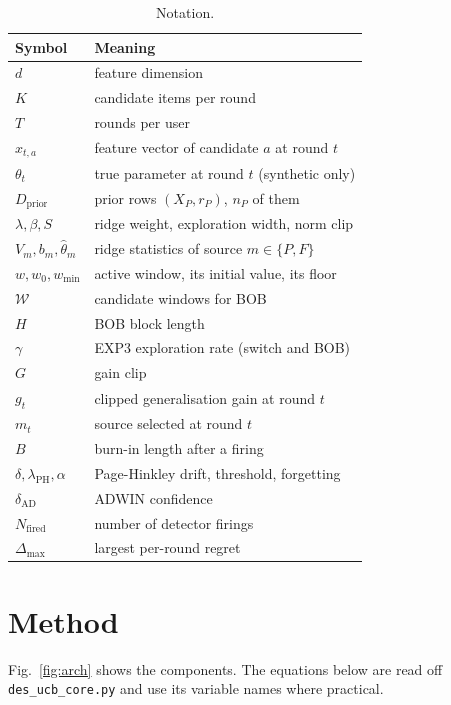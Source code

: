 \begin{table}[t]
\centering
\caption{Notation.}
\label{tab:notation}
\small
\begin{tabular}{ll}
\toprule
Symbol & Meaning \\
\midrule
$d$ & feature dimension \\
$K$ & candidate items per round \\
$T$ & rounds per user \\
$x_{t,a}$ & feature vector of candidate $a$ at round $t$ \\
$\theta_t$ & true parameter at round $t$ (synthetic only) \\
$D_{\mathrm{prior}}$ & prior rows $(X_P,r_P)$, $n_P$ of them \\
$\lambda,\beta,S$ & ridge weight, exploration width, norm clip \\
$V_m,b_m,\hat\theta_m$ & ridge statistics of source $m\in\{P,F\}$ \\
$w,w_0,w_{\min}$ & active window, its initial value, its floor \\
$\mathcal W$ & candidate windows for BOB \\
$H$ & BOB block length \\
$\gamma$ & EXP3 exploration rate (switch and BOB) \\
$G$ & gain clip \\
$g_t$ & clipped generalisation gain at round $t$ \\
$m_t$ & source selected at round $t$ \\
$B$ & burn-in length after a firing \\
$\delta,\lambda_{\mathrm{PH}},\alpha$ & Page-Hinkley drift, threshold, forgetting \\
$\delta_{\mathrm{AD}}$ & ADWIN confidence \\
$N_{\mathrm{fired}}$ & number of detector firings \\
$\Delta_{\max}$ & largest per-round regret \\
\bottomrule
\end{tabular}
\end{table}

\section{Method}
\label{sec:method}

Fig.~\ref{fig:arch} shows the components. The equations below are read off \texttt{des\_ucb\_core.py} and use its variable names where practical.

